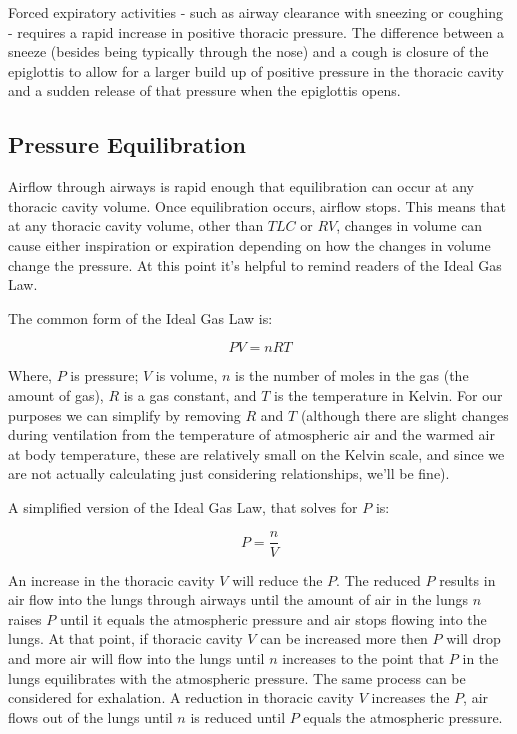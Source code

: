 Forced expiratory activities - such as airway clearance with sneezing or coughing - requires a rapid increase in positive thoracic pressure. The difference between a sneeze (besides being typically through the nose) and a cough is closure of the epiglottis to allow for a larger build up of positive pressure in the thoracic cavity and a sudden release of that pressure when the epiglottis opens.  

\subsection{Pressure Equilibration} 
Airflow through airways is rapid enough that equilibration can occur at any thoracic cavity volume. Once equilibration occurs, airflow stops. This means that at any thoracic cavity volume, other than $TLC$ or $RV$, changes in volume can cause either inspiration or expiration depending on how the changes in volume change the pressure. At this point it's helpful to remind readers of the Ideal Gas Law. 

The common form of the Ideal Gas Law is: 

\begin{equation}
    PV = nRT
    \label{ideal_gas}
\end{equation}

Where, $P$ is pressure; $V$ is volume, $n$ is the number of moles in the gas (the amount of gas), $R$ is a gas constant, and $T$ is the temperature in Kelvin. For our purposes we can simplify by removing $R$ and $T$ (although there are slight changes during ventilation from the temperature of atmospheric air and the warmed air at body temperature, these are relatively small on the Kelvin scale, and since we are not actually calculating just considering relationships, we'll be fine).

A simplified version of the Ideal Gas Law, that solves for $P$ is:

\begin{equation}
    P = \frac{n}{V}
\end{equation}

An increase in the thoracic cavity $V$ will reduce the $P$. The reduced $P$ results in air flow into the lungs through airways until the amount of air in the lungs $n$ raises $P$ until it equals the atmospheric pressure and air stops flowing into the lungs. At that point, if thoracic cavity $V$ can be increased more then $P$ will drop and more air will flow into the lungs until $n$ increases to the point that $P$ in the lungs equilibrates with the atmospheric pressure. 
The same process can be considered for exhalation. A reduction in thoracic cavity $V$ increases the $P$, air flows out of the lungs until $n$ is reduced until $P$ equals the atmospheric pressure. 

